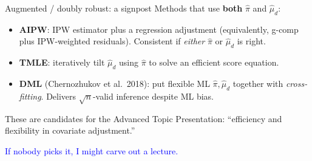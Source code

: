 \documentclass[xcolor=dvipsnames]{beamer}
\begin{document}
\begin{frame}{Augmented / doubly robust: a signpost}
\small
{} Methods that use \textbf{both} $\widehat\pi$ and $\widehat{\mu}_d$:
\begin{itemize}
\item \textbf{AIPW}: IPW estimator plus a regression adjustment (equivalently, g-comp plus IPW-weighted residuals). Consistent if \textit{either} $\widehat\pi$ or $\widehat\mu_d$ is right.
\item \textbf{TMLE}: iteratively tilt $\widehat\mu_d$ using $\widehat\pi$ to solve an efficient score equation.
\item \textbf{DML} (Chernozhukov et al.\ 2018): put flexible ML $\widehat\pi,\widehat\mu_d$ together with \textit{cross-fitting}. Delivers $\sqrt{n}$-valid inference despite ML bias.
\end{itemize}

\medskip
{} These are candidates for the Advanced Topic Presentation: ``efficiency and flexibility in covariate adjustment.''

\medskip
{} \textcolor{Blue}{If nobody picks it, I might carve out a lecture.}
\end{frame}




\end{document}
